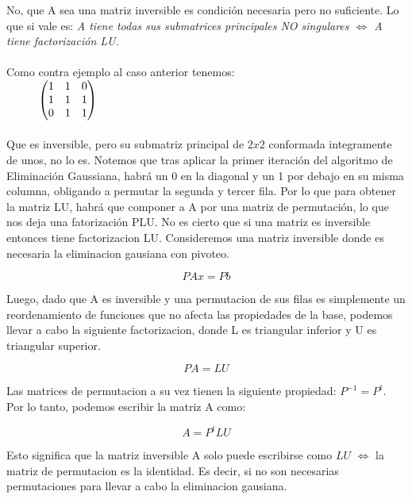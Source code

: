\documentclass[10pt,a4paper]{article}
\begin{document}
No, que A sea una matriz inversible es condición necesaria pero no suficiente. Lo que si vale es: \textit{A tiene todas sus submatrices principales NO singulares $\iff$ A tiene factorización LU.}
\\
\\
Como contra ejemplo al caso anterior tenemos:
\\

$
\hspace{10mm}
\left(
\begin{matrix}
1 & 1 & 0 \\
1 & 1 & 1 \\
0 & 1 & 1 \\
\end{matrix}\right)
$
\\
\\
Que es inversible, pero su submatriz principal de $2x2$ conformada integramente de unos, no lo es. Notemos que tras aplicar la primer iteración del algoritmo de Eliminación Gaussiana, habrá un 0 en la diagonal y un 1 por debajo en su misma columna, obligando a permutar la segunda y tercer fila. Por lo que para obtener la matriz LU, habrá que componer a A por una matriz de permutación, lo que nos deja una fatorización PLU. 
\iffalse
No es cierto que si una matriz es inversible entonces tiene factorizacion LU. Consideremos una matriz inversible donde es necesaria la eliminacion gausiana con pivoteo.

\begin{equation}
PAx = Pb
\end{equation}

Luego, dado que A es inversible y una permutacion de sus filas es simplemente un reordenamiento de funciones que no afecta las propiedades de la base, podemos llevar a cabo la siguiente factorizacion, donde L es triangular inferior y U es triangular superior.

\begin{equation}
PA = LU
\end{equation}

Las matrices de permutacion a su vez tienen la siguiente propiedad: $P^{-1} = P^t$. Por lo tanto, podemos escribir la matriz A como:

\begin{equation}
A = P^tLU
\end{equation}

Esto significa que la matriz inversible A solo puede escribirse como $LU$ $\iff$ la matriz de permutacion es la identidad. Es decir, si no son necesarias permutaciones para  llevar a cabo la eliminacion gausiana.
\end{document}
